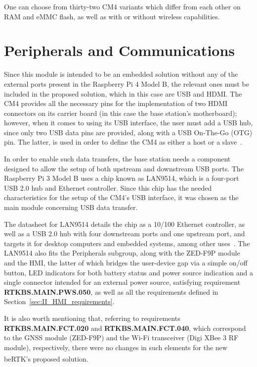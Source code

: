 One can choose from thirty-two CM4 variants which differ from each other on RAM and eMMC flash, as well as with or without wireless capabilities.

\section{Peripherals and Communications}\label{sec:312_Peripherals_Communications}

Since this module is intended to be an embedded solution without any of the external ports present in the Raspberry Pi 4 Model B, the relevant ones must be included in the proposed solution, which in this case are USB and HDMI. The CM4 provides all the necessary pins for the implementation of two HDMI connectors on its carrier board (in this case the base station's motherboard); however, when it comes to using its USB interface, the user must add a USB hub, since only two USB data pins are provided, along with a USB On-The-Go (OTG) pin. The latter, is used in order to define the CM4 as either a host or a slave~\cite{CM4}.


In order to enable such data transfers, the base station needs a component designed to allow the setup of both upstream and downstream USB ports. The Raspberry Pi 3 Model B uses a chip known as LAN9514, which is a four-port USB 2.0 hub and Ethernet controller. Since this chip has the needed characteristics for the setup of the CM4's USB interface, it was chosen as the main module concerning USB data transfer.

The datasheet for LAN9514 details the chip as a 10/100 Ethernet controller, as well as a USB 2.0 hub with four downstream ports and one upstream port, and targets it for desktop computers and embedded systems, among other uses~\cite{LAN9514}. The LAN9514 also fits the Peripherals subgroup, along with the ZED-F9P module and the HMI, the latter of which bridges the user-device gap via a simple on/off button, LED indicators for both battery status and power source indication and a single connector intended for an external power source, satisfying requirement \textbf{RTKBS.MAIN.PWS.050}, as well as all the requirements defined in Section~\ref{sec:II_HMI_requirements}.

It is also worth mentioning that, referring to requirements \textbf{RTKBS.MAIN.FCT.020} and \textbf{RTKBS.MAIN.FCT.040}, which correspond to the GNSS module (ZED-F9P) and the Wi-Fi transceiver (Digi XBee 3 RF module), respectively, there were no changes in such elements for the new beRTK\textsuperscript{\textregistered}'s proposed solution.

